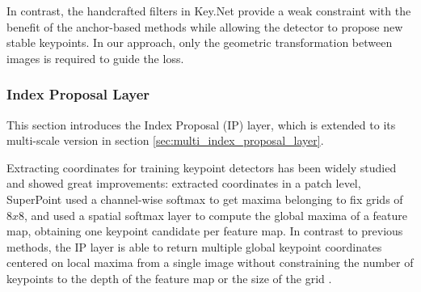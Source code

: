 In contrast, the handcrafted filters in Key.Net provide a weak constraint with the benefit of the anchor-based methods while allowing the detector to propose new stable keypoints. In our approach, only the geometric transformation between images is required to guide the loss. \par


\subsubsection{Index Proposal Layer}
\label{sec:single_index_proposal_layer}


This section introduces the Index Proposal (IP) layer, which is extended to its multi-scale version in section \ref{sec:multi_index_proposal_layer}. \par


Extracting coordinates for training keypoint detectors has been widely studied and showed great improvements: \cite{LIFT, Karel_Vedaldi_ECCV_16, Zhang_Felix_CVPR_17} extracted coordinates in a patch level, SuperPoint \cite{detone2017superpoint} used a channel-wise softmax to get maxima belonging to fix grids of $8x8$, and \cite{keypointnet_nips_18} used a spatial softmax layer to compute the global maxima of a feature map, obtaining one keypoint candidate per feature map. In contrast to previous methods, the IP layer is able to return multiple global keypoint coordinates centered on local maxima from a single image without constraining the number of keypoints to the depth of the feature map \cite{keypointnet_nips_18} or the size of the grid \cite{detone2017superpoint}.

